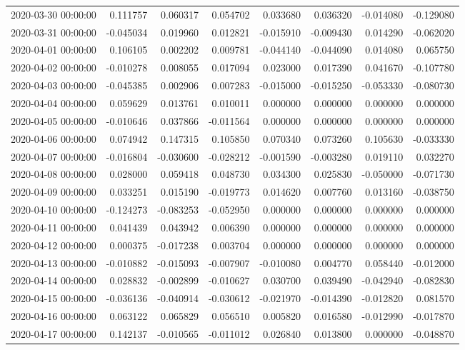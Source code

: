 \begin{tabular}{lrrrrrrr}
2020-03-30 00:00:00 & 0.111757 & 0.060317 & 0.054702 & 0.033680 & 0.036320 & -0.014080 & -0.129080 \\
2020-03-31 00:00:00 & -0.045034 & 0.019960 & 0.012821 & -0.015910 & -0.009430 & 0.014290 & -0.062020 \\
2020-04-01 00:00:00 & 0.106105 & 0.002202 & 0.009781 & -0.044140 & -0.044090 & 0.014080 & 0.065750 \\
2020-04-02 00:00:00 & -0.010278 & 0.008055 & 0.017094 & 0.023000 & 0.017390 & 0.041670 & -0.107780 \\
2020-04-03 00:00:00 & -0.045385 & 0.002906 & 0.007283 & -0.015000 & -0.015250 & -0.053330 & -0.080730 \\
2020-04-04 00:00:00 & 0.059629 & 0.013761 & 0.010011 & 0.000000 & 0.000000 & 0.000000 & 0.000000 \\
2020-04-05 00:00:00 & -0.010646 & 0.037866 & -0.011564 & 0.000000 & 0.000000 & 0.000000 & 0.000000 \\
2020-04-06 00:00:00 & 0.074942 & 0.147315 & 0.105850 & 0.070340 & 0.073260 & 0.105630 & -0.033330 \\
2020-04-07 00:00:00 & -0.016804 & -0.030600 & -0.028212 & -0.001590 & -0.003280 & 0.019110 & 0.032270 \\
2020-04-08 00:00:00 & 0.028000 & 0.059418 & 0.048730 & 0.034300 & 0.025830 & -0.050000 & -0.071730 \\
2020-04-09 00:00:00 & 0.033251 & 0.015190 & -0.019773 & 0.014620 & 0.007760 & 0.013160 & -0.038750 \\
2020-04-10 00:00:00 & -0.124273 & -0.083253 & -0.052950 & 0.000000 & 0.000000 & 0.000000 & 0.000000 \\
2020-04-11 00:00:00 & 0.041439 & 0.043942 & 0.006390 & 0.000000 & 0.000000 & 0.000000 & 0.000000 \\
2020-04-12 00:00:00 & 0.000375 & -0.017238 & 0.003704 & 0.000000 & 0.000000 & 0.000000 & 0.000000 \\
2020-04-13 00:00:00 & -0.010882 & -0.015093 & -0.007907 & -0.010080 & 0.004770 & 0.058440 & -0.012000 \\
2020-04-14 00:00:00 & 0.028832 & -0.002899 & -0.010627 & 0.030700 & 0.039490 & -0.042940 & -0.082830 \\
2020-04-15 00:00:00 & -0.036136 & -0.040914 & -0.030612 & -0.021970 & -0.014390 & -0.012820 & 0.081570 \\
2020-04-16 00:00:00 & 0.063122 & 0.065829 & 0.056510 & 0.005820 & 0.016580 & -0.012990 & -0.017870 \\
2020-04-17 00:00:00 & 0.142137 & -0.010565 & -0.011012 & 0.026840 & 0.013800 & 0.000000 & -0.048870 \\

\end{tabular}
